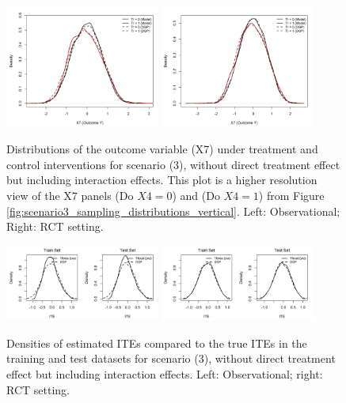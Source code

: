 \begin{figure}[htbp]
\centering
\includegraphics[width=0.45\textwidth]{img/results/observ_scenario3_X7_treatment_densities.png}
\includegraphics[width=0.45\textwidth]{img/results/rct_scenario3_X7_treatment_densities.png}
\caption{Distributions of the outcome variable (X7) under treatment and control interventions for scenario (3), without direct treatment effect but including interaction effects. This plot is a higher resolution view of the X7 panels (Do $X4=0$) and (Do $X4=1$) from Figure \ref{fig:scenario3_sampling_distributions_vertical}. Left: Observational; Right: RCT setting.}
\label{fig:scenario3_outcome_distributions}
\end{figure}




\begin{figure}[htbp]
\centering
\includegraphics[width=0.45\textwidth]{img/results/observ_scenario3_ITE_densities_train_test.png}
\includegraphics[width=0.45\textwidth]{img/results/rct_scenario3_ITE_densities_train_test.png}
\caption{Densities of estimated ITEs compared to the true ITEs in the training and test datasets for scenario (3), without direct treatment effect but including interaction effects. Left: Observational; right: RCT setting.}
\label{fig:scenario3_ite_densities_train_test}
\end{figure}






